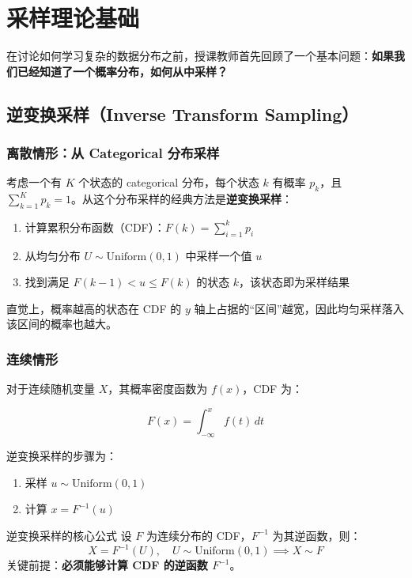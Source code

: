 \section{采样理论基础}

在讨论如何学习复杂的数据分布之前，授课教师首先回顾了一个基本问题：\textbf{如果我们已经知道了一个概率分布，如何从中采样？}

\subsection{逆变换采样（Inverse Transform Sampling）}

\subsubsection{离散情形：从 Categorical 分布采样}

考虑一个有 $K$ 个状态的 categorical 分布，每个状态 $k$ 有概率 $p_k$，且 $\sum_{k=1}^K p_k = 1$。从这个分布采样的经典方法是\textbf{逆变换采样}：

\begin{enumerate}
    \item 计算累积分布函数（CDF）：$F(k) = \sum_{i=1}^{k} p_i$
    \item 从均匀分布 $U \sim \text{Uniform}(0, 1)$ 中采样一个值 $u$
    \item 找到满足 $F(k-1) < u \leq F(k)$ 的状态 $k$，该状态即为采样结果
\end{enumerate}

直觉上，概率越高的状态在 CDF 的 $y$ 轴上占据的``区间''越宽，因此均匀采样落入该区间的概率也越大。

\subsubsection{连续情形}

对于连续随机变量 $X$，其概率密度函数为 $f(x)$，CDF 为：

$$F(x) = \int_{-\infty}^{x} f(t) \, dt$$

逆变换采样的步骤为：

\begin{enumerate}
    \item 采样 $u \sim \text{Uniform}(0, 1)$
    \item 计算 $x = F^{-1}(u)$
\end{enumerate}

\begin{importantbox}{逆变换采样的核心公式}
设 $F$ 为连续分布的 CDF，$F^{-1}$ 为其逆函数，则：
$$X = F^{-1}(U), \quad U \sim \text{Uniform}(0,1) \implies X \sim F$$
关键前提：\textbf{必须能够计算 CDF 的逆函数 $F^{-1}$}。
\end{importantbox}

